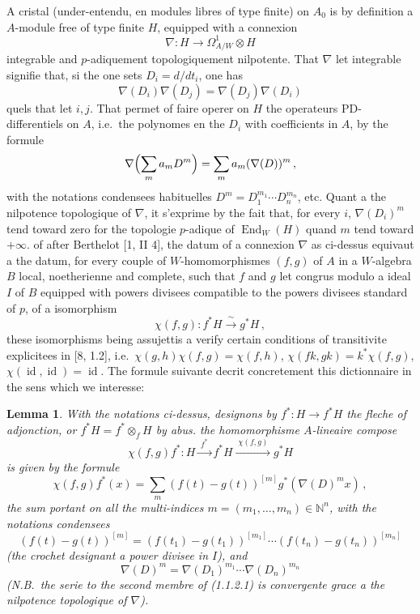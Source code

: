 \documentclass[12pt,a4paper]{article}
\theoremstyle{plain}
\newtheorem{lemma}[theorem]{Lemma}
\theoremstyle{definition}
\theoremstyle{remark}
\DeclareMathOperator{\End}{End}
\DeclareMathOperator{\id}{id}
\begin{document}
A cristal (under-entendu, en modules libres of type finite) on $A_0$ is by definition a $A$-module free of type finite $H$, equipped with a connexion
\[
\nabla : H \longrightarrow \Omega^1_{A/W} \otimes H
\]
integrable and $p$-adiquement topologiquement nilpotente. That $\nabla$ let integrable signifie that, si the one sets $D_i = d/dt_i$, one has
\[
\nabla(D_i)\nabla(D_j) = \nabla(D_j)\nabla(D_i)
\]
quels that let $i,j$. That permet of faire operer on $H$ the operateurs PD-differentiels on $A$, i.e.\ the polynomes en the $D_i$ with coefficients in $A$, by the formule
\[
\nabla\Bigl(\sum_m a_m D^m\Bigr) = \sum_m a_m (\nabla(D))^m\,,
\]
with the notations condensees habituelles $D^m = D_1^{m_1} \cdots D_n^{m_n}$, etc. Quant a the nilpotence topologique of $\nabla$, it s'exprime by the fait that, for every $i$, $\nabla(D_i)^m$ tend toward zero for the topologie $p$-adique of $\End_W(H)$ quand $m$ tend toward $+\infty$. of after Berthelot [1, II 4], the datum of a connexion $\nabla$ as ci-dessus equivaut a the datum, for every couple of $W$-homomorphismes $(f,g)$ of $A$ in a $W$-algebra $B$ local, noetherienne and complete, such that $f$ and $g$ let congrus modulo a ideal $I$ of $B$ equipped with powers divisees compatible to the powers divisees standard of $p$, of a isomorphism
\begin{equation}
\chi(f,g) : f^*H \xrightarrow{\;\sim\;} g^*H\,,\tag{$*$}
\end{equation}
these isomorphisms being assujettis a verify certain conditions of transitivite explicitees in [8, 1.2], i.e.\ $\chi(g,h)\chi(f,g) = \chi(f,h)$, $\chi(fk,gk) = k^*\chi(f,g)$, $\chi(\id,\id) = \id$. The formule suivante decrit concretement this dictionnaire in the sens which we interesse:

\begin{lemma}\label{lem:1.1.2}
With the notations ci-dessus, designons by $f^* : H \to f^*H$ the fleche of adjonction, or $f^*H = f^* \otimes_f H$ by abus. the homomorphisme $A$-lineaire compose
\[
\chi(f,g)f^* : H \xrightarrow{\;f^*\;} f^*H \xrightarrow{\;\chi(f,g)\;} g^*H
\]
is given by the formule
\begin{equation}\label{eq:1.1.2.1}
\chi(f,g)f^*(x) = \sum_m (f(t)-g(t))^{[m]} g^*(\nabla(D)^m x)\,,
\end{equation}
the sum portant on all the multi-indices $m = (m_1, \ldots, m_n) \in \mathbb{N}^n$, with the notations condensees
\[
(f(t)-g(t))^{[m]} = (f(t_1)-g(t_1))^{[m_1]} \cdots (f(t_n)-g(t_n))^{[m_n]}
\]
(the crochet designant a power divisee in $I$), and
\[
\nabla(D)^m = \nabla(D_1)^{m_1} \cdots \nabla(D_n)^{m_n}
\]
\emph{(N.B.\ the serie to the second membre of (1.1.2.1) is convergente grace a the nilpotence topologique of $\nabla$).}
\end{lemma}
\end{document}
